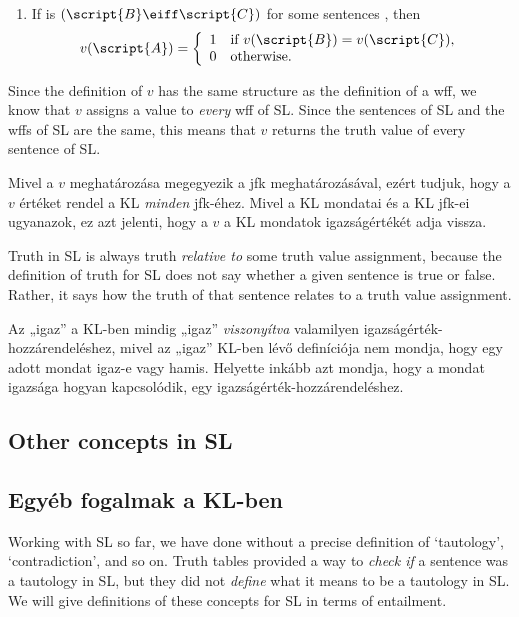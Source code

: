 \begin{enumerate}

\item If  is $(\script{B}\eiff\script{C})$ for some sentences , then
\begin{displaymath}v(\script{A}) =
	\left\{\begin{array}{ll}
	1 & \mbox{if $v(\script{B}) = v(\script{C})$},\\
	0 & \mbox{otherwise.}
	\end{array}\right.
\end{displaymath}
\end{enumerate}

Since the definition of $v$ has the same structure as the definition of a wff, we know that $v$ assigns a value to \emph{every} wff of SL. Since the sentences of SL and the wffs of SL are the same, this means that $v$ returns the truth value of every sentence of SL.

Mivel a $v$ meghatározása megegyezik a jfk meghatározásával, ezért tudjuk, hogy a $v$ értéket rendel a KL \emph{minden} jfk-éhez. Mivel a KL mondatai és a KL jfk-ei ugyanazok, ez azt jelenti, hogy a $v$ a KL mondatok igazságértékét adja vissza.

Truth in SL is always truth \emph{relative to} some truth value assignment, because the definition of truth for SL does not say whether a given sentence is true or false. Rather, it says how the truth of that sentence relates to a truth value assignment.

Az „igaz” a KL-ben mindig „igaz” \emph{viszonyítva} valamilyen igazságérték-hozzárendeléshez, mivel az „igaz” KL-ben lévő definíciója nem mondja, hogy egy adott mondat igaz-e vagy hamis. Helyette inkább azt mondja, hogy a mondat igazsága hogyan kapcsolódik, egy igazságérték-hozzárendeléshez.

\subsection*{Other concepts in SL}
\subsection{Egyéb fogalmak a KL-ben}
Working with SL so far, we have done without a precise definition of `tautology', `contradiction', and so on. Truth tables provided a way to \emph{check if} a sentence was a tautology in SL, but they did not \emph{define} what it means to be a tautology in SL. We will give definitions of these concepts for SL in terms of entailment.

